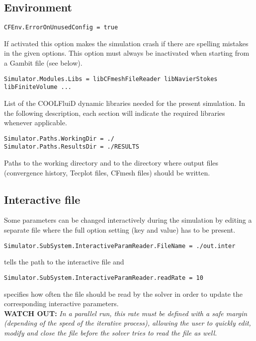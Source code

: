 \documentclass[11pt]{article}
\begin{document}
\subsection{Environment}

\begin{verbatim}
CFEnv.ErrorOnUnusedConfig = true
\end{verbatim}
If activated this option makes the simulation crash if there are spelling mistakes in the given options.
This option must always be inactivated when starting from a Gambit file (see below).

\begin{verbatim}
Simulator.Modules.Libs = libCFmeshFileReader libNavierStokes libFiniteVolume ...
\end{verbatim}
List of the COOLFluiD dynamic libraries needed for the present simulation. In the following description, 
each section will indicate the required libraries whenever applicable.

\begin{verbatim}
Simulator.Paths.WorkingDir = ./
Simulator.Paths.ResultsDir = ./RESULTS
\end{verbatim}
Paths to the working directory and to the directory where output files (convergence history, Tecplot files, CFmesh files) should be written. 

\subsection{Interactive file}

Some parameters can be changed interactively during the simulation by editing a separate file
where the full option setting (key and value) has to be present.

\begin{verbatim}
Simulator.SubSystem.InteractiveParamReader.FileName = ./out.inter
\end{verbatim}
tells the path to the interactive file and
\begin{verbatim}
Simulator.SubSystem.InteractiveParamReader.readRate = 10
\end{verbatim}
specifies how often the file should be read by the solver in order to update the corresponding interactive parameters.\\
{\bf WATCH OUT:}  {\it In a parallel run, this rate must be defined with a safe margin (depending of the speed of the iterative process), 
  allowing the user to quickly edit, modify and close the file before the solver tries to read the file as well.}
\end{document}

